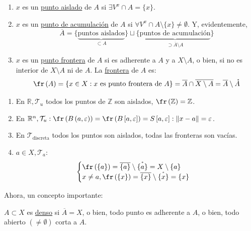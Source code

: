 \begin{defi}    
\begin{enumerate}
    \item $x$ es un \underline{punto aislado} de $A$ si $\exists V^x \cap A = \{x\}$.
    \item $x$ es un \underline{punto de acumulación} de $A$ si $\forall V^x \cap A \setminus \{x\} \neq \emptyset$. Y, evidentemente,
    \[
    \overline{A} = \{\underbrace{\text{puntos aislados}}_{\subset A}\} \sqcup \{\underbrace{\text{puntos de acumulación}}_{\supset \overline{A} \setminus A}\} 
    \]
    \item $x$ es un \underline{punto frontera} de $A$ si es adherente a $A$ y a $X \setminus A$, o bien, si no es interior de $X \setminus A$ ni de $A$. La \underline{frontera} de $A$ es: 
    \[
    \fr\left( A \right) = \{x \in X: x \text{ es punto frontera de } A\} = \overline{A} \cap \overline{X \setminus A} = \overline{A} \setminus \mathring{A}     
    \]
\end{enumerate}
\end{defi}

\begin{ej}
\begin{enumerate}
    \item En $\mathbb{R}, \mathcal{T}_u$ todos los puntos de $\mathbb{Z}$ son aislados, $\fr\left( \mathbb{Z} \right) = \mathbb{Z}$.
    \item En $\mathbb{R}^n, \mathcal{T}_u: \fr\left( B\left( a, \varepsilon \right) \right) = \fr\left( B\left[ a, \varepsilon \right] \right) = S\left[ a, \varepsilon \right] : \lVert x - a \rVert = \varepsilon$.
    \item En $\mathcal{T}_{\text{discreta}}$ todos los puntos son aislados, todas las fronteras son vacías.
    \item $a \in X, \mathcal{T}_a: $
    \[
    \begin{cases}
        \fr\left( \{a\} \right) = \overline{\{a\}} \setminus \mathring{\{a\}} = X \setminus \{a\}\\
        x \neq a, \fr\left( \{x\} \right) = \overline{\{x\}} \setminus \mathring{\{x\}} = \{x\} 
    \end{cases} 
    \]
\end{enumerate}
\end{ej}

Ahora, un concepto importante:
\begin{defi}
$A \subset X$ es \underline{denso} si $\overline{A} = X$, o bien, todo punto es adherente a $A$, o bien, todo abierto $\left( \neq \emptyset \right)$ corta a $A$.
\end{defi}

